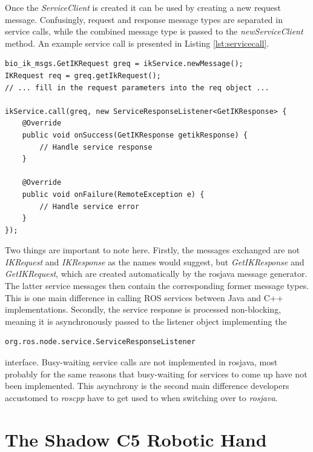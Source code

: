Once the \textit{ServiceClient} is created it can be used by creating a new request message. Confusingly, request and response message types are separated in service calls, while the combined message type is passed to the \textit{newServiceClient} method. An example service call is presented in Listing \ref{lst:servicecall}.

\begin{lstlisting}[caption={An example rosjava service call}, label=lst:servicecall]
bio_ik_msgs.GetIKRequest greq = ikService.newMessage();
IKRequest req = greq.getIkRequest();
// ... fill in the request parameters into the req object ...

ikService.call(greq, new ServiceResponseListener<GetIKResponse> {
	@Override
	public void onSuccess(GetIKResponse getikResponse) {
		// Handle service response
	}
	
	@Override
	public void onFailure(RemoteException e) {
		// Handle service error
	}
});
\end{lstlisting}

Two things are important to note here. Firstly, the messages exchanged are not \textit{IKRequest} and \textit{IKResponse} as the names would suggest, but \textit{GetIKResponse} and \textit{GetIKRequest}, which are created automatically by the rosjava message generator. The latter service messages then contain the corresponding former message types. This is one main difference in calling ROS services between Java and C++ implementations. Secondly, the service response is processed non-blocking, meaning it is asynchronously passed to the listener object implementing  the 
\begin{lstlisting}[numbers=none]
org.ros.node.service.ServiceResponseListener
\end{lstlisting}
interface. Busy-waiting service calls are not implemented in rosjava, most probably for the same reasons that busy-waiting for services to come up have not been implemented. This asynchrony is the second main difference developers accustomed to \textit{roscpp} have to get used to when switching over to \textit{rosjava}.

\section{The Shadow C5 Robotic Hand}
\label{sec:shadowhand}


